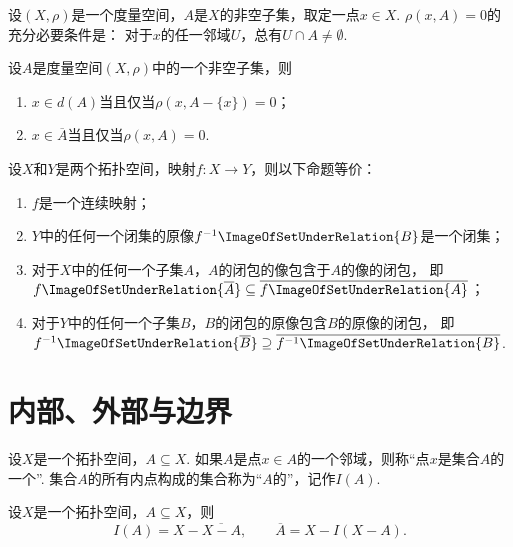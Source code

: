 \begin{corollary}
设\((X,\rho)\)是一个度量空间，\(A\)是\(X\)的非空子集，取定一点\(x \in X\).
\(\rho(x,A) = 0\)的充分必要条件是：
对于\(x\)的任一邻域\(U\)，总有\(U \cap A \neq \emptyset\).
\end{corollary}

\begin{theorem}
设\(A\)是度量空间\((X,\rho)\)中的一个非空子集，则
\begin{enumerate}
	\item \(x \in d(A)\)当且仅当\(\rho(x,A-\{x\})=0\)；
	\item \(x \in \overline{A}\)当且仅当\(\rho(x,A)=0\).
\end{enumerate}
\end{theorem}

\begin{theorem}
设\(X\)和\(Y\)是两个拓扑空间，映射\(f\colon X \to Y\)，则以下命题等价：
\begin{enumerate}
	\item \(f\)是一个连续映射；
	\item \(Y\)中的任何一个闭集的原像\(f^{-1}\ImageOfSetUnderRelation{B}\)是一个闭集；
	\item 对于\(X\)中的任何一个子集\(A\)，\(A\)的闭包的像包含于\(A\)的像的闭包，
	即\(f\ImageOfSetUnderRelation{\overline{A}}
	\subseteq
	\overline{f\ImageOfSetUnderRelation{A}}\)；
	\item 对于\(Y\)中的任何一个子集\(B\)，\(B\)的闭包的原像包含\(B\)的原像的闭包，
	即\(f^{-1}\ImageOfSetUnderRelation{\overline{B}}
	\supseteq
	\overline{f^{-1}\ImageOfSetUnderRelation{B}}\).
\end{enumerate}
\end{theorem}

\section{内部、外部与边界}
\begin{definition}\label{definition:拓扑学.内部的概念}
设\(X\)是一个拓扑空间，\(A \subseteq X\).
如果\(A\)是点\(x \in A\)的一个邻域，则称“点\(x\)是集合\(A\)的一个”.
集合\(A\)的所有内点构成的集合称为“\(A\)的”，记作\(I(A)\).
\end{definition}

\begin{theorem}\label{theorem:拓扑学.内部与闭包的联系}
设\(X\)是一个拓扑空间，\(A \subseteq X\)，则\[
I(A) = X - \overline{X - A}, \qquad
\overline{A} = X - I(X - A).
\]
\end{theorem}

